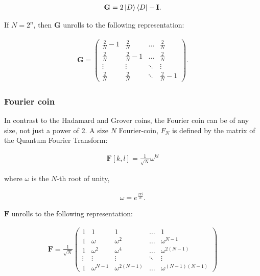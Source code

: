 \begin{align*}
    \mathbf{G} = 2\ket{D}\bra{D} - \mathbf{I}.
\end{align*}

If $N = 2^n$, then $\mathbf{G}$ unrolls to the following representation:

\begin{align*}
  \mathbf{G} = \begin{pmatrix}
      \frac{2}{N} - 1 & \frac{2}{N} & \dots  & \frac{2}{N} \\
      \frac{2}{N} & \frac{2}{N} - 1 & \dots  & \frac{2}{N} \\
      \vdots & \vdots & \ddots & \vdots \\
      \frac{2}{N} & \frac{2}{N} & \ddots & \frac{2}{N} - 1
    \end{pmatrix}.
\end{align*}

\subsubsection{Fourier coin}

In contrast to the Hadamard and Grover coins, the Fourier coin can be of any size, not just a power of 2. A size $N$ Fourier-coin, $F_N$ is defined by the matrix of the Quantum Fourier Transform:

\begin{align*}
\mathbf{F}[k,l] = \frac{1}{\sqrt{N}} \omega^{kl}
\end{align*}

where $\omega$ is the $N$-th root of unity,

\begin{align*}
\omega = e^{\frac{2\pi{}i}{N}}.
\end{align*}

$\mathbf{F}$ unrolls to the following representation:

\begin{align*}
\mathbf{F} = \frac{1}{\sqrt{N}}
\begin{pmatrix}
  1 & 1 & 1 & \dots & 1 \\
  1 & \omega & \omega^2 & \dots & \omega^{N-1} \\
  1 & \omega^2 & \omega^4 & \dots & \omega^{2(N-1)} \\
  \vdots & \vdots & \vdots & \ddots & \vdots \\
  1 & \omega^{N-1} & \omega^{2(N-1)} & \dots & \omega^{(N-1)(N-1)}
\end{pmatrix}
\end{align*}

